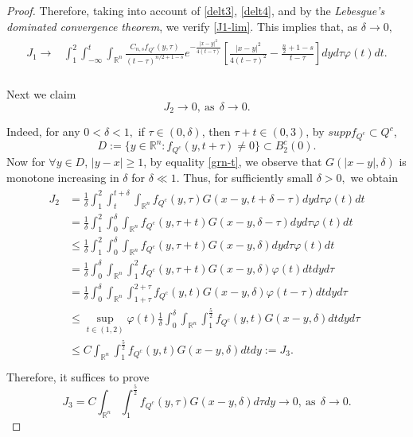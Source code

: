 \documentclass[12pt]{article}
\theoremstyle{remark}
\numberwithin{equation}{section}
\newcommand{\R}{\mathbb{R}}
\newcommand{\mb}{\mbox}
\begin{document}
\begin{proof}
Therefore, taking into account of \eqref{delt3}, \eqref{delt4}, and by the {\em Lebesgue's dominated convergence theorem}, we verify \eqref{J1-lim}.  This implies that, as $\delta\to 0,$
\begin{eqnarray}\label{est-J1}
\begin{aligned}
J_1\to&\int_1^2\int_{-\infty}^{t}\int_{\R^n}\frac{C_{n,s}f_{Q^c}(y,\tau)}{{(t-\tau)}^{n/2+1-s}} e^{-\frac{|x-y|^2}{4(t-\tau)}}\left[\frac{|x-y|^2}{4(t-\tau)^2}-\frac{\frac{n}{2}+1-s}{t-\tau}\right]dyd\tau\varphi(t)dt.\\
\end{aligned}
\end{eqnarray}

Next we claim \begin{equation}\label{est-J2}J_2\to 0, \ \mb{as}\ \ \delta\to 0.\end{equation}

Indeed, for any $0<\delta<1,$ if $\tau\in(0,\delta)$, then $\tau+t\in(0,3)$, by $supp f_{Q^c}\subset Q^c$,
\[D:=\{y\in\R^n:f_{Q^c}(y,t+\tau)\neq 0\}\subset B_2^c(0).\]
 Now for $\forall y\in D$, $|y-x|\geq 1$,  by equality \eqref{grn-t}, we observe that $G(|x-y|,\delta)$ is monotone increasing in $\delta$ for $\delta\ll1$.  %
Thus, for sufficiently small $\delta>0,$ we obtain
\begin{eqnarray}\label{est-t2}
\begin{aligned}
J_2&=\frac{1}{\delta}\int_1^2\int_{t}^{t+\delta}\int_{\R^n}f_{Q^c}(y,\tau)G(x-y,t+\delta-\tau)dyd\tau\varphi(t)dt\\
&=\frac{1}{\delta}\int_1^2\int_{0}^{\delta}\int_{\R^n}f_{Q^c}(y,\tau+t)G(x-y,\delta-\tau)dyd\tau\varphi(t)dt\\
&\leq\frac{1}{\delta}\int_1^2\int_{0}^{\delta}\int_{\R^n}f_{Q^c}(y,\tau+t)G(x-y,\delta)dyd\tau\varphi(t)dt\\
&=\frac{1}{\delta}\int_{0}^{\delta}\int_{\R^n}\int_1^2f_{Q^c}(y,\tau+t)G(x-y,\delta)\varphi(t)dtdyd\tau\\
&=\frac{1}{\delta}\int_{0}^{\delta}\int_{\R^n}\int_{1+\tau}^{2+\tau}f_{Q^c}(y,t)G(x-y,\delta)\varphi(t-\tau)dtdyd\tau\\
&\leq \sup_{t\in(1,2)}\varphi(t)\frac{1}{\delta}\int_{0}^{\delta}\int_{\R^n}\int_{1}^{\frac{5}{2}}f_{Q^c}(y,t)G(x-y,\delta)dtdyd\tau\\
&\leq C\int_{\R^n}\int_{1}^{\frac{5}{2}}f_{Q^c}(y,t)G(x-y,\delta)dtdy:=J_3.\\
\end{aligned}
\end{eqnarray}
Therefore, it suffices to prove
\begin{equation}\label{est-J3}J_3=C\int_{\R^n}\int_{1}^{\frac{5}{2}}f_{Q^c}(y,\tau)G(x-y,\delta)d\tau dy\to 0, \ \mb{as}\ \ \delta\to 0.\end{equation}


\end{proof}
\end{document}
